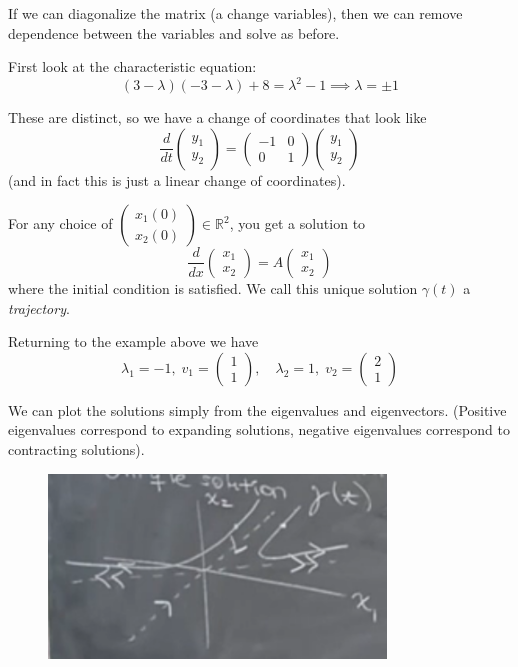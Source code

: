 \documentclass[12pt]{article}
\newcommand{\R}{\mathbb{R}}
\begin{document}
    If we can diagonalize the matrix (a change variables), then we can remove dependence between the variables and solve as before.
    
    First look at the characteristic equation:
    \[(3 - \lambda)(-3 - \lambda) + 8 = \lambda^2 - 1 \implies \lambda = \pm 1\]

    These are distinct, so we have a change of coordinates that look like 
    \[\frac{d}{dt}\begin{pmatrix}
        y_1\\y_2
    \end{pmatrix} = \begin{pmatrix}
        -1 & 0\\
        0 & 1
    \end{pmatrix} \begin{pmatrix}
        y_1\\ y_2
    \end{pmatrix}\]
    (and in fact this is just a linear change of coordinates). 

    For any choice of $\begin{pmatrix}
        x_1(0)\\ x_2(0)
    \end{pmatrix} \in \R^2$, you get a solution to 
    \[\frac{d}{dx} \begin{pmatrix}
        x_1\\x_2
    \end{pmatrix} = A\begin{pmatrix}
        x_1\\x_2
    \end{pmatrix}\] 
    where the initial condition is satisfied. We call this unique solution $\gamma(t)$ a \emph{trajectory}. 

    Returning to the example above we have 
    \[\lambda_1 = -1, \; v_1 = \begin{pmatrix}
        1\\1
    \end{pmatrix}, \quad \lambda_2 = 1, \; v_2 = \begin{pmatrix}
        2\\1
    \end{pmatrix}\]

    We can plot the solutions simply from the eigenvalues and eigenvectors. (Positive eigenvalues correspond to expanding solutions, negative eigenvalues correspond to contracting solutions).
    
    \begin{figure}[ht]
        \centering
        \includegraphics[width=0.8\textwidth]{Images/Lecture 1 Trajectories.png}
    \end{figure}
\end{document}

